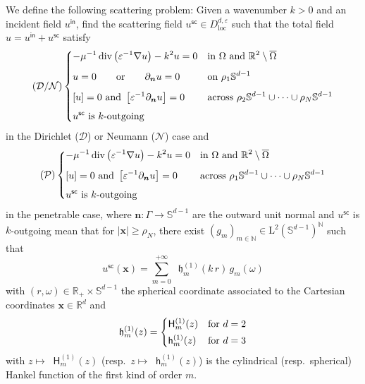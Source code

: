 \documentclass[12pt,a4paper]{article}
\newcommand{\bbN}{\mathbb{N}}
\newcommand{\bbR}{\mathbb{R}}
\newcommand{\bbS}{\mathbb{S}}
\newcommand{\calD}{\mathcal{D}}
\newcommand{\calN}{\mathcal{N}}
\newcommand{\calP}{\mathcal{P}}
\newcommand{\rmL}{\mathrm{L}}
\newcommand{\Hu}{\mathop{}\!\mathsf{H}^{(1)}}
\newcommand{\hu}{\mathop{}\!\mathsf{h}^{(1)}}
\newcommand{\outh}{\mathop{}\!\mathfrak{h}^{(1)}}
\DeclareMathOperator{\Div}{div}
\newcommand{\plr}[1]{\left(#1\right)}
\newcommand{\clr}[1]{\left[#1\right]}
\newcommand{\vect}[1]{\boldsymbol{#1}}
\newcommand{\vx}{\boldsymbol{x}}
\newcommand{\eps}{\varepsilon}
\newcommand{\loc}{\mathrm{loc}}
\newcommand{\inc}{\mathsf{in}}
\newcommand{\sca}{\mathsf{sc}}
\begin{document}
We define the following scattering problem: Given a wavenumber $k > 0$ and an incident field $u^\inc$, find the scattering field $u^\sca \in D_\loc^{d, \eps}$ such that the total field $u = u^\inc + u^\sca$ satisfy
\begin{equation}\label{eq:scat_pde_im}
    (\calD / \calN)\begin{dcases}
        -\mu^{-1}\Div\plr{\eps^{-1} \nabla u} - k^2 u = 0 & \text{in } \Omega \text{ and } \bbR^2 \setminus \overline{\Omega}\\[1ex]
        u = 0 \qquad \text{or} \qquad \partial_{\vect{n}}u = 0 & \text{on } \rho_1\bbS^{d-1}\\[1ex]
        \clr{u} = 0 \ \text{and}\ \clr{\eps^{-1} \partial_{\vect{n}} u} = 0 & \text{across } \rho_2\bbS^{d-1} \cup \cdots \cup \rho_N\bbS^{d-1}\\[1ex]
        \text{$u^\sca$ is $k$-outgoing} 
    \end{dcases}
\end{equation}
in the Dirichlet ($\calD$) or Neumann ($\calN$) case and
\begin{equation}\label{eq:scat_pde}
    (\calP)\begin{dcases}
        -\mu^{-1}\Div\plr{\eps^{-1} \nabla u} - k^2 u = 0 & \text{in } \Omega \text{ and } \bbR^2 \setminus \overline{\Omega}\\[1ex]
        \clr{u} = 0 \ \text{and}\ \clr{\eps^{-1} \partial_{\vect{n}} u} = 0 & \text{across } \rho_1\bbS^{d-1} \cup \cdots \cup \rho_N\bbS^{d-1}\\[1ex]
        \text{$u^\sca$ is $k$-outgoing} 
    \end{dcases}
\end{equation}
in the penetrable case, where $\vect{n} : \Gamma \to \bbS^{d-1}$ are the outward unit normal and $u^\sca$ is $k$-outgoing mean that for $|\vx| \ge \rho_N$, there exist $(g_m)_{m \in \bbN} \in \rmL^2(\bbS^{d-1})^{\bbN}$ such that
\begin{equation}\label{eq:OWC}
    u^\sca(\vx) = \sum_{m = 0}^{+\infty} \outh_m(k\, r)\, g_m(\omega)
\end{equation}
with $(r, \omega) \in \bbR_+ \times \bbS^{d-1}$ the spherical coordinate associated to the Cartesian coordinates $\vx \in \bbR^d$ and
\begin{equation}
    \outh_m(z) = \begin{dcases}
        \Hu_m(z) & \text{for } d = 2\\
        \hu_m(z) & \text{for } d = 3
    \end{dcases}
\end{equation}
with $z \mapsto \Hu_m(z)$ (resp.\ $z \mapsto \hu_m(z)$) is the cylindrical (resp.\ spherical) Hankel function of the first kind of order $m$.
\end{document}
